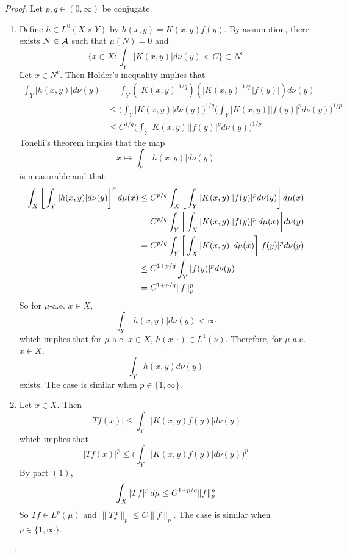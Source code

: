 \documentclass{book}
\begin{document}
	\begin{proof}Let $p,q \in (0,\infty)$ be conjugate.
	\begin{enumerate}
	\item Define $h \in L^0(X \times Y)$ by $h(x,y) = K(x, y) f(y)$. By assumption, there exists $N \in \mathcal{A}$ such that $\mu(N) = 0$ and  $$\bigg \{x \in X: \int_Y |K(x, y)| d \nu(y) < C \bigg\} \subset N^c$$ 
	Let $x \in N^c$. Then Holder's inequality implies that
	\begin{align*}
	\int_Y |h(x,y)| d\nu(y) 
	&= \int_Y (|K(x,y)|^{1/q})(|K(x,y)|^{1/p}|f(y)|) d\nu(y) \\
	& \leq \bigg( \int_Y |K(x,y)| d \nu(y) \bigg)^{1/q} \bigg( \int_Y |K(x,y)||f(y)|^p d\nu(y) \bigg)^{1/p} \\
	& \leq C^{1/q} \bigg( \int_Y |K(x,y)||f(y)|^p d\nu(y) \bigg)^{1/p}
	\end{align*}
	Tonelli's theorem implies that the map $$x \mapsto \int_Y |h(x,y)| d\nu(y) $$ is measurable and that  
	\begin{align*}
	\int_X \bigg[ \int_Y |h(x,y)| d\nu(y) \bigg]^p \, d \mu(x) 
	&\leq  C^{p/q}  \int_X \bigg[ \int_Y |K(x,y)||f(y)|^p d\nu(y) \bigg] \, d \mu(x) \\
	&= C^{p/q}  \int_Y \bigg[ \int_X |K(x,y)||f(y)|^p \, d \mu(x) \bigg] d\nu(y) \\
	&= C^{p/q}  \int_Y \bigg[ \int_X |K(x,y)| \, d \mu(x) \bigg] |f(y)|^p d\nu(y) \\
	& \leq C^{1 + p/q} \int_Y |f(y)|^p  d\nu(y) \\
	& = C^{1 + p/q} \|f\|_p^p
	\end{align*}
	So for $\mu$-a.e. $x \in X$, $$\int_Y |h(x,y)| d\nu(y) < \infty$$ which implies that for $\mu$-a.e. $x \in X$, $h(x, \cdot) \in L^1(\nu)$. Therefore, for $\mu$-a.e. $x \in X$, $$\int_Y h(x,y) d\nu(y)$$ exists. The case is similar when $p \in \{1, \infty\}$.
	\item Let $x \in X$. Then $$|Tf(x)| \leq \int_Y |K(x,y)f(y)| d \nu(y)$$ which implies that $$|Tf(x)|^p \leq \bigg( \int_Y |K(x,y)f(y)| d \nu(y) \bigg)^p$$
	By part $(1)$, $$\int_X |Tf|^p \, d \mu \leq C^{1+p/q}\|f\|_p^p$$ 
	So $Tf \in L^p(\mu)$ and $\|Tf\|_p \leq C\|f\|_p$.
	The case is similar when $p \in \{1, \infty\}$.
	\end{enumerate}
	\end{proof}
	
	
	
	
	
	
	

	
	
\end{document}
